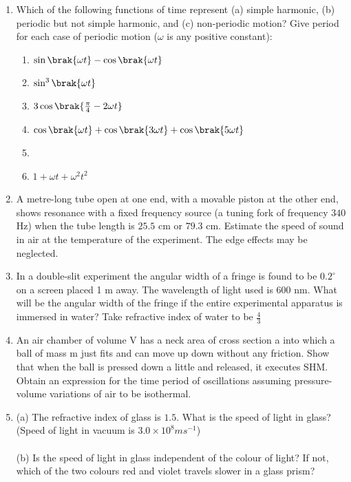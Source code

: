 \begin{enumerate}[label=\thesection.\arabic*,ref=\thesection.\theenumi]
\item Which of the following functions of time represent (a) simple harmonic, (b) periodic
 but not simple harmonic, and (c) non-periodic motion? Give period for each case of periodic motion ($\omega$ is any positive constant):\\
 \begin{enumerate}
 \item $\sin\brak{\omega t}-\cos\brak{\omega t}$\\
 \item $\sin^3\brak{\omega t}$\\
 \item $3\cos\brak{\frac{\pi}{4}- 2\omega t}$\\
 \item $\cos\brak{\omega t}+\cos\brak{3\omega t}+\cos\brak{5\omega t}$\\
 \item {}\\
 \item $1+\omega t+\omega^2 t^2$\\
  \end{enumerate}
 \solution

 \pagebreak

 \item A metre-long tube open at one end, with a movable piston at the other end, shows resonance with a fixed frequency source (a tuning fork of frequency $340$ Hz) when the tube length is $25.5$ cm or $79.3$ cm. Estimate the speed of sound in air at the temperature of the experiment. The edge effects may be neglected.\\
 \solution
 \pagebreak
\item In a double-slit experiment the angular width of a fringe is found to
be $0.2^\circ$ on a screen placed 1 m away. The wavelength of light used is
600 nm. What will be the angular width of the fringe if the entire
experimental apparatus is immersed in water? Take refractive index
of water to be $\frac{4}{3}$
\solution
\pagebreak
\item An air chamber of volume V has a neck area of cross section a into which a ball of mass m just fits and can move up down without any friction. Show that when the ball is pressed down a little and released, it executes SHM. Obtain an expression for the time period of oscillations assuming pressure-volume variations of air to be isothermal.
\solution
\pagebreak

\item
(a) The refractive index of glass is $1.5$. What is the speed of light in
glass?(Speed of light in vacuum is $3.0\times 10^{8} m s^{-1}$) \\
\\
(b) Is the speed of light in glass independent of the colour of light? If
not, which of the two colours red and violet travels slower in a
glass prism?\\
\solution
\pagebreak

\end{enumerate}

